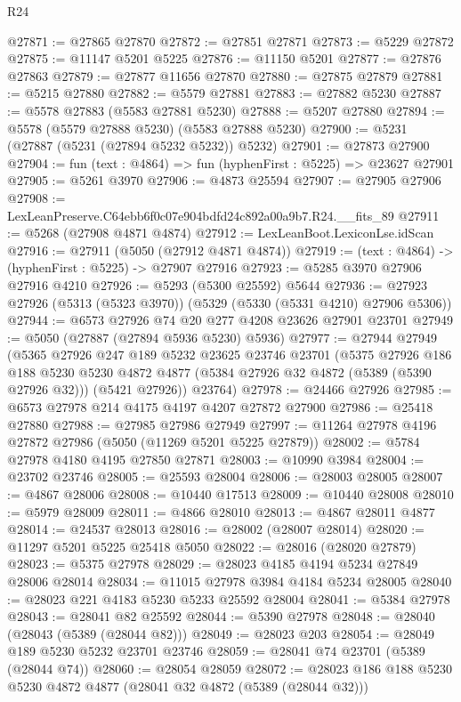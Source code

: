 \begin{lexlean}{R24}
\begin{coremodule}
@27871 := @27865 @27870
@27872 := @27851 @27871
@27873 := @5229 @27872
@27875 := @11147 @5201 @5225
@27876 := @11150 @5201
@27877 := @27876 @27863
@27879 := @27877 @11656 @27870
@27880 := @27875 @27879
@27881 := @5215 @27880
@27882 := @5579 @27881
@27883 := @27882 @5230
@27887 := @5578 @27883 (@5583 @27881 @5230)
@27888 := @5207 @27880
@27894 := @5578 (@5579 @27888 @5230) (@5583 @27888 @5230)
@27900 := @5231 (@27887 (@5231 (@27894 @5232 @5232)) @5232)
@27901 := @27873 @27900
@27904 := fun (text : @4864) => fun (hyphenFirst : @5225) => @23627 @27901
@27905 := @5261 @3970
@27906 := @4873 @25594
@27907 := @27905 @27906
@27908 := LexLeanPreserve.C64ebb6f0c07e904bdfd24c892a00a9b7.R24.__fits_89
@27911 := @5268 (@27908 @4871 @4874)
@27912 := LexLeanBoot.LexiconLse.idScan
@27916 := @27911 (@5050 (@27912 @4871 @4874))
@27919 := (text : @4864) -> (hyphenFirst : @5225) -> @27907 @27916
@27923 := @5285 @3970 @27906 @27916 @4210
@27926 := @5293 (@5300 @25592) @5644
@27936 := @27923 @27926 (@5313 (@5323 @3970)) (@5329 (@5330 (@5331 @4210) @27906 @5306))
@27944 := @6573 @27926 @74 @20 @277 @4208 @23626 @27901 @23701
@27949 := @5050 (@27887 (@27894 @5936 @5230) @5936)
@27977 := @27944
    @27949
    (@5365
      @27926
      @247
      @189
      @5232
      @23625
      @23746
      @23701
      (@5375
        @27926
        @186
        @188
        @5230
        @5230
        @4872
        @4877
        (@5384 @27926 @32 @4872 (@5389 (@5390 @27926 @32)))
        (@5421 @27926))
      @23764)
@27978 := @24466 @27926
@27985 := @6573 @27978 @214 @4175 @4197 @4207 @27872 @27900
@27986 := @25418 @27880
@27988 := @27985 @27986 @27949
@27997 := @11264 @27978 @4196 @27872 @27986 (@5050 (@11269 @5201 @5225 @27879))
@28002 := @5784 @27978 @4180 @4195 @27850 @27871
@28003 := @10990 @3984
@28004 := @23702 @23746
@28005 := @25593 @28004
@28006 := @28003 @28005
@28007 := @4867 @28006
@28008 := @10440 @17513
@28009 := @10440 @28008
@28010 := @5979 @28009
@28011 := @4866 @28010
@28013 := @4867 @28011 @4877
@28014 := @24537 @28013
@28016 := @28002 (@28007 @28014)
@28020 := @11297 @5201 @5225 @25418 @5050
@28022 := @28016 (@28020 @27879)
@28023 := @5375 @27978
@28029 := @28023 @4185 @4194 @5234 @27849 @28006 @28014
@28034 := @11015 @27978 @3984 @4184 @5234 @28005
@28040 := @28023 @221 @4183 @5230 @5233 @25592 @28004
@28041 := @5384 @27978
@28043 := @28041 @82 @25592
@28044 := @5390 @27978
@28048 := @28040 (@28043 (@5389 (@28044 @82)))
@28049 := @28023 @203
@28054 := @28049 @189 @5230 @5232 @23701 @23746
@28059 := @28041 @74 @23701 (@5389 (@28044 @74))
@28060 := @28054 @28059
@28072 := @28023 @186 @188 @5230 @5230 @4872 @4877 (@28041 @32 @4872 (@5389 (@28044 @32)))

\end{coremodule}
\end{lexlean}
